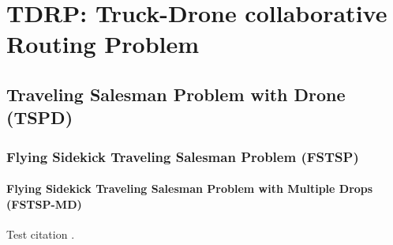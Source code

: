 \part{TDRP: Truck-Drone collaborative Routing Problem}

\chapter{Traveling Salesman Problem with Drone (TSPD)}

\section{Flying Sidekick Traveling Salesman Problem (FSTSP)}

\subsection{Flying Sidekick Traveling Salesman Problem with Multiple Drops (FSTSP-MD)}

Test citation \cite{2015The}.
